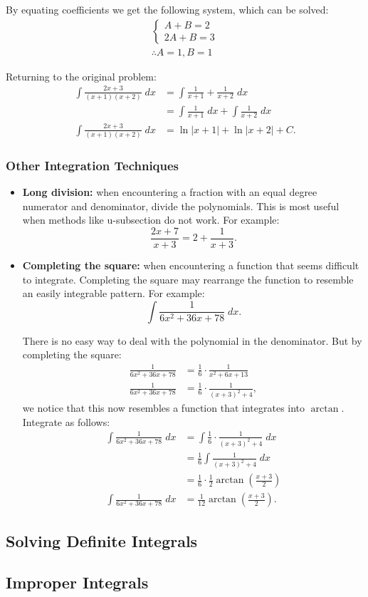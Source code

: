 \documentclass[12pt]{article}
\begin{document}
\noindent By equating coefficients we get the following system, which can be solved:
\begin{gather*}
	\begin{cases}
		A + B = 2 \\
		2A + B = 3
	\end{cases} \\
	\therefore A = 1, B = 1
\end{gather*}

\noindent Returning to the original problem:
\begin{align*}
	\int \frac{2x + 3}{(x + 1)(x + 2)} \; dx &= \int \frac{1}{x + 1} + \frac{1}{x + 2} \; dx \\[5pt]
	&= \int \frac{1}{x + 1} \; dx + \int \frac{1}{x + 2} \; dx \\[5pt]
	\int \frac{2x + 3}{(x + 1)(x + 2)} \; dx &= \ln |x + 1| + \ln |x + 2| + C.
\end{align*}

\subsubsection{Other Integration Techniques}
\begin{itemize}
	\item \textbf{Long division:} when encountering a fraction with an equal degree numerator and denominator, divide the polynomials. This is most useful when methods like u-subsection do not work. For example:
	\[ \frac{2x + 7}{x + 3} = 2 + \frac{1}{x + 3}. \]

	\item \textbf{Completing the square:} when encountering a function that seems difficult to integrate. Completing the square may rearrange the function to resemble an easily integrable pattern. For example:
	\[ \int \frac{1}{6x^2 + 36x + 78} \; dx. \]

	There is no easy way to deal with the polynomial in the denominator. But by completing the square:
	\begin{align*}
		\frac{1}{6x^2 + 36x + 78} &= \frac{1}{6} \cdot \frac{1}{x^2 + 6x + 13} \\[5pt]
		\frac{1}{6x^2 + 36x + 78} &= \frac{1}{6} \cdot \frac{1}{(x + 3)^2 + 4},
	\end{align*}
	we notice that this now resembles a function that integrates into $\arctan$. Integrate as follows:
	\begin{align*}
		\int \frac{1}{6x^2 + 36x + 78} \; dx &= \int \frac{1}{6} \cdot \frac{1}{(x + 3)^2 + 4} \; dx \\[5pt]
		&= \frac{1}{6} \int \frac{1}{(x + 3)^2 + 4} \; dx \\[5pt]
		&= \frac{1}{6} \cdot \frac{1}{2} \arctan \left( \frac{x + 3}{2} \right) \\[5pt]
		\int \frac{1}{6x^2 + 36x + 78} \; dx &= \frac{1}{12} \arctan \left( \frac{x + 3}{2} \right).
	\end{align*}
\end{itemize}

\subsection{Solving Definite Integrals}

\subsection{Improper Integrals}
\end{document}
